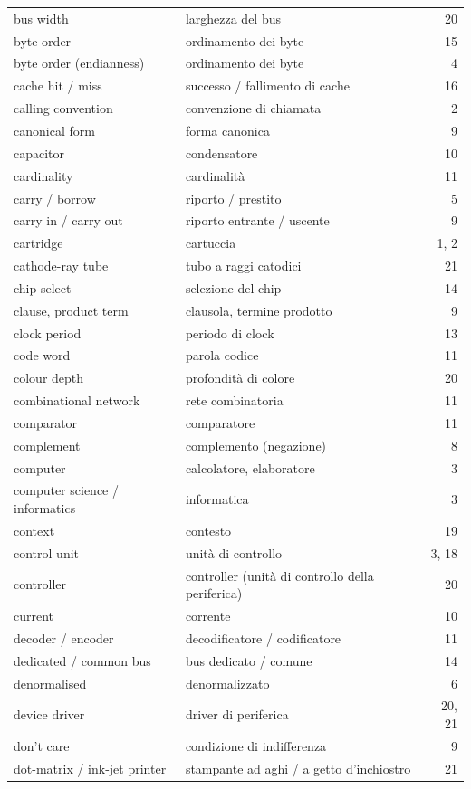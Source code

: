 {\begin{longtable}{@{}p{}p{}r@{}}
bus width & larghezza del bus & 20\\
byte order & ordinamento dei byte & 15\\
byte order (endianness) & ordinamento dei byte & 4\\
cache hit / miss & successo / fallimento di cache & 16\\
calling convention & convenzione di chiamata & 2\\
canonical form & forma canonica & 9\\
capacitor & condensatore & 10\\
cardinality & cardinalità & 11\\
carry / borrow & riporto / prestito & 5\\
carry in / carry out & riporto entrante / uscente & 9\\
cartridge & cartuccia & 1, 2\\
cathode-ray tube & tubo a raggi catodici & 21\\
chip select & selezione del chip & 14\\
clause, product term & clausola, termine prodotto & 9\\
clock period & periodo di clock & 13\\
code word & parola codice & 11\\
colour depth & profondità di colore & 20\\
combinational network & rete combinatoria & 11\\
comparator & comparatore & 11\\
complement & complemento (negazione) & 8\\
computer & calcolatore, elaboratore & 3\\
computer science / informatics & informatica & 3\\
context & contesto & 19\\
control unit & unità di controllo & 3, 18\\
controller & controller (unità di controllo della periferica) & 20\\
current & corrente & 10\\
decoder / encoder & decodificatore / codificatore & 11\\
dedicated / common bus & bus dedicato / comune & 14\\
denormalised & denormalizzato & 6\\
device driver & driver di periferica & 20, 21\\
don't care & condizione di indifferenza & 9\\
dot-matrix / ink-jet printer & stampante ad aghi / a getto d'inchiostro & 21\\

\end{longtable}}
